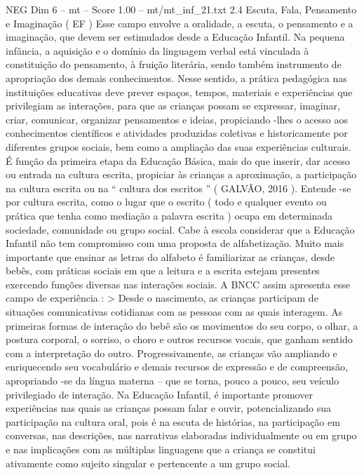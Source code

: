 \begin{textsample}{NEG Dim 6 – mt – Score 1.00 – mt/mt\_inf\_21.txt}  \label{ex:f6_neg_126}
2.4 Escuta, Fala, Pensamento e Imaginação ( EF ) Esse campo envolve a oralidade, a escuta, o pensamento e a imaginação, que devem ser estimulados desde a Educação Infantil.
Na pequena infância, a aquisição e o domínio da linguagem verbal está vinculada à constituição do pensamento, à fruição literária, sendo também instrumento de apropriação dos demais conhecimentos.
Nesse sentido, a prática pedagógica nas instituições educativas deve prever espaços, tempos, materiais e experiências que privilegiam as interações, para que as crianças possam se expressar, imaginar, criar, comunicar, organizar pensamentos e ideias, propiciando -lhes o acesso aos conhecimentos científicos e atividades produzidas coletivas e historicamente por diferentes grupos sociais, bem como a ampliação das suas experiências culturais.
É função da primeira etapa da Educação Básica, mais do que inserir, dar acesso ou entrada na cultura escrita, propiciar às crianças a aproximação, a participação na cultura escrita ou na “ cultura dos escritos ” ( GALVÃO, 2016 ).
Entende -se por cultura escrita, como o lugar que o escrito ( todo e qualquer evento ou prática que tenha como mediação a palavra escrita ) ocupa em determinada sociedade, comunidade ou grupo social.
Cabe à escola considerar que a Educação Infantil não tem compromisso com uma proposta de alfabetização.
Muito mais importante que ensinar as letras do alfabeto é familiarizar as crianças, desde bebês, com práticas sociais em que a leitura e a escrita estejam presentes exercendo funções diversas nas interações sociais.
A BNCC assim apresenta esse campo de experiência : > Desde o nascimento, as crianças participam de situações comunicativas cotidianas com as pessoas com as quais interagem.
As primeiras formas de interação do bebê são os movimentos do seu corpo, o olhar, a postura corporal, o sorriso, o choro e outros recursos vocais, que ganham sentido com a interpretação do outro.
Progressivamente, as crianças vão ampliando e enriquecendo seu vocabulário e demais recursos de expressão e de compreensão, apropriando -se da língua materna – que se torna, pouco a pouco, seu veículo privilegiado de interação.
Na Educação Infantil, é importante promover experiências nas quais as crianças possam falar e ouvir, potencializando sua participação na cultura oral, pois é na escuta de histórias, na participação em conversas, nas descrições, nas narrativas elaboradas individualmente ou em grupo e nas implicações com as múltiplas linguagens que a criança se constitui ativamente como sujeito singular e pertencente a um grupo social.

\end{textsample}

